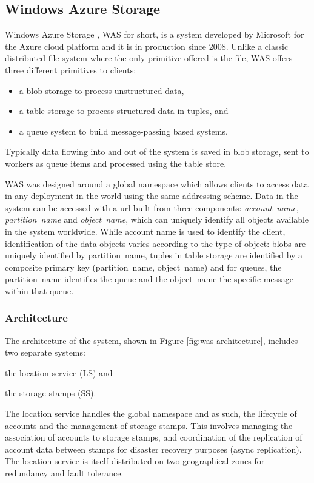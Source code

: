 \subsection{Windows Azure Storage}
Windows Azure Storage \cite{DBLP:conf/sosp/CalderWONSMXSWSHUKEBMAAHHBDAMSMR11}, WAS for short, is a system developed by Microsoft for the Azure cloud platform and it is in production since 2008.
Unlike a classic distributed file-system where the only primitive offered is the file, WAS offers three different primitives to clients:
\begin{itemize}
    \item a blob storage to process unstructured data,
    \item a table storage to process structured data in tuples, and
    \item a queue system to build message-passing based systems.
\end{itemize}
Typically data flowing into and out of the system is saved in blob storage, sent to workers as queue items and processed using the table store.

WAS was designed around a global namespace which allows clients to access data in any deployment in the world using the same addressing scheme.
Data in the system can be accessed with a url built from three components: \emph{account~name}, \emph{partition~name} and \emph{object~name}, which can uniquely identify all objects available in the system worldwide.
While account name is used to identify the client, identification of the data objects varies according to the type of object: blobs are uniquely identified by partition~name, tuples in table storage are identified by a composite primary key (partition~name, object~name) and for queues, the partition~name identifies the queue and the object~name the specific message within that queue.

\subsubsection{Architecture}
The architecture of the system, shown in Figure \ref{fig:was-architecture}, includes two separate systems:
\begin{inparaenum}[i)]
    \item the location service (LS) and
    \item the storage stamps (SS).
\end{inparaenum}
The location service handles the global namespace and as such, the lifecycle of accounts and the management of storage stamps.
This involves managing the association of accounts to storage stamps, and coordination of the replication of account data between stamps for disaster recovery purposes (async replication).
The location service is itself distributed on two geographical zones for redundancy and fault tolerance.

